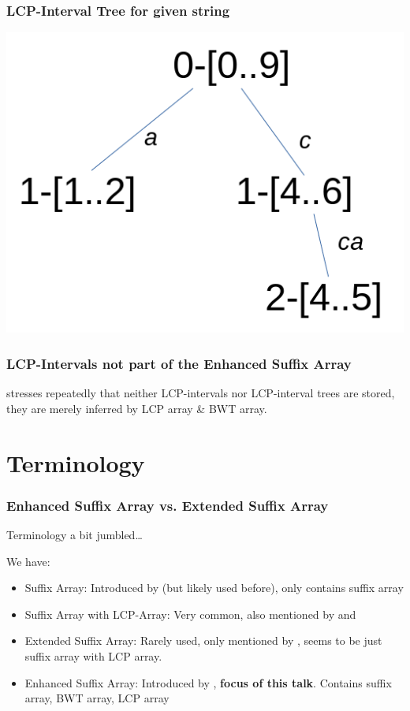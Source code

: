\documentclass[compress,handout]{beamer} %
\begin{document}
\begin{frame}
	\frametitle{LCP-Interval Tree for given string}
	\includegraphics[width=\textwidth, height=\textheight, keepaspectratio=true]{LCP_interval_tree}
\end{frame}

\begin{frame}
	\frametitle{LCP-Intervals not part of the Enhanced Suffix Array}
	\cite{abouelhoda2002enhanced} stresses repeatedly that neither
	LCP-intervals nor LCP-interval trees are stored, they are merely
	inferred by LCP array \& BWT array.
\end{frame}

\section{Terminology}

\begin{frame}
	\frametitle{Enhanced Suffix Array vs. Extended Suffix Array}
	Terminology a bit jumbled…

	We have:
	\begin{itemize}
		\item Suffix Array: Introduced by \cite{manber1993suffix} (but likely used before), only contains suffix array
		\item Suffix Array with LCP-Array: Very common, also mentioned by \cite{manber1993suffix} and \cite{gusfield1997algorithms}
		\item Extended Suffix Array: Rarely used, only mentioned by \cite{salson2010dynamic}, seems to be just suffix array with LCP array.
		\item Enhanced Suffix Array: Introduced by \cite{abouelhoda2002enhanced}, \textbf{focus of this talk}. Contains suffix array, BWT array, LCP array
	\end{itemize}
\end{frame}
\end{document}
